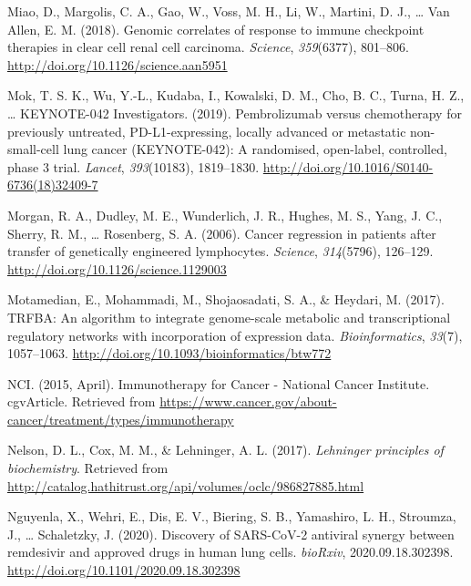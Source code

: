 \documentclass[12pt,twoside,openany,\mydriver]{thesis}  %
\begin{document}
\leavevmode\hypertarget{ref-miao_genomic_2018}{}%
Miao, D., Margolis, C. A., Gao, W., Voss, M. H., Li, W., Martini, D. J., \ldots{} Van Allen, E. M. (2018). Genomic correlates of response to immune checkpoint therapies in clear cell renal cell carcinoma. \emph{Science}, \emph{359}(6377), 801--806. \url{http://doi.org/10.1126/science.aan5951}

\leavevmode\hypertarget{ref-mok_pembrolizumab_2019}{}%
Mok, T. S. K., Wu, Y.-L., Kudaba, I., Kowalski, D. M., Cho, B. C., Turna, H. Z., \ldots{} KEYNOTE-042 Investigators. (2019). Pembrolizumab versus chemotherapy for previously untreated, PD-L1-expressing, locally advanced or metastatic non-small-cell lung cancer (KEYNOTE-042): A randomised, open-label, controlled, phase 3 trial. \emph{Lancet}, \emph{393}(10183), 1819--1830. \url{http://doi.org/10.1016/S0140-6736(18)32409-7}

\leavevmode\hypertarget{ref-morgan_cancer_2006}{}%
Morgan, R. A., Dudley, M. E., Wunderlich, J. R., Hughes, M. S., Yang, J. C., Sherry, R. M., \ldots{} Rosenberg, S. A. (2006). Cancer regression in patients after transfer of genetically engineered lymphocytes. \emph{Science}, \emph{314}(5796), 126--129. \url{http://doi.org/10.1126/science.1129003}

\leavevmode\hypertarget{ref-motamedian_trfba_2017}{}%
Motamedian, E., Mohammadi, M., Shojaosadati, S. A., \& Heydari, M. (2017). TRFBA: An algorithm to integrate genome-scale metabolic and transcriptional regulatory networks with incorporation of expression data. \emph{Bioinformatics}, \emph{33}(7), 1057--1063. \url{http://doi.org/10.1093/bioinformatics/btw772}

\leavevmode\hypertarget{ref-nci_immunotherapy_2015}{}%
NCI. (2015, April). Immunotherapy for Cancer - National Cancer Institute. cgvArticle. Retrieved from \url{https://www.cancer.gov/about-cancer/treatment/types/immunotherapy}

\leavevmode\hypertarget{ref-nelson_lehninger_2017}{}%
Nelson, D. L., Cox, M. M., \& Lehninger, A. L. (2017). \emph{Lehninger principles of biochemistry}. Retrieved from \url{http://catalog.hathitrust.org/api/volumes/oclc/986827885.html}

\leavevmode\hypertarget{ref-nguyenla_discovery_2020}{}%
Nguyenla, X., Wehri, E., Dis, E. V., Biering, S. B., Yamashiro, L. H., Stroumza, J., \ldots{} Schaletzky, J. (2020). Discovery of SARS-CoV-2 antiviral synergy between remdesivir and approved drugs in human lung cells. \emph{bioRxiv}, 2020.09.18.302398. \url{http://doi.org/10.1101/2020.09.18.302398}
\end{document}
